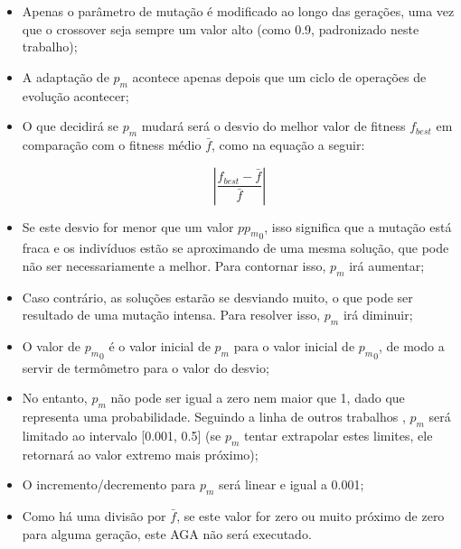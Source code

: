 \begin{itemize}

	\item Apenas o parâmetro de mutação é modificado ao longo das gerações, uma vez que o crossover seja sempre um valor alto (como 0.9, padronizado neste trabalho);

	\item A adaptação de $p_m$ acontece apenas depois que um ciclo de operações de evolução acontecer;

	\item O que decidirá se $p_m$ mudará será o desvio do melhor valor de fitness $f_{best}$ em comparação com o fitness médio $\bar{f}$, como na equação a seguir:

\begin{equation}
	\left| \frac{f_{best} - \bar{f}}{\bar{f}} \right|
\label{eq:aga}
\end{equation}

	\item Se este desvio for menor que um valor $p{p_m}_0$, isso significa que a mutação está fraca e os indivíduos estão se aproximando de uma mesma solução, que pode não ser necessariamente a melhor. Para contornar isso, $p_m$ irá aumentar;

	\item Caso contrário, as soluções estarão se desviando muito, o que pode ser resultado de uma mutação intensa. Para resolver isso, $p_m$ irá diminuir;

	\item O valor de ${p_m}_0$ é o valor inicial de $p_m$ para o valor inicial de ${p_m}_0$, de modo a servir de termômetro para o valor do desvio;

	\item No entanto, $p_m$ não pode ser igual a zero nem maior que 1, dado que representa uma probabilidade. Seguindo a linha de outros trabalhos \cite{matthias2013variable}, $p_m$ será limitado ao intervalo [0.001, 0.5] (se $p_m$ tentar extrapolar estes limites, ele retornará ao valor extremo mais próximo);

	\item O incremento/decremento para $p_m$ será linear e igual a 0.001;

	\item Como há uma divisão por $\bar{f}$, se este valor for zero ou muito próximo de zero para alguma geração, este AGA não será executado.

\end{itemize}

